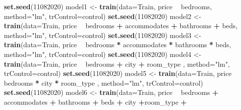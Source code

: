 \documentclass[]{book}
\newenvironment{Shaded}{\begin{snugshade}}{\end{snugshade}}
\newcommand{\KeywordTok}[1]{\textcolor[rgb]{0.13,0.29,0.53}{\textbf{#1}}}
\newcommand{\DataTypeTok}[1]{\textcolor[rgb]{0.13,0.29,0.53}{#1}}
\newcommand{\DecValTok}[1]{\textcolor[rgb]{0.00,0.00,0.81}{#1}}
\newcommand{\StringTok}[1]{\textcolor[rgb]{0.31,0.60,0.02}{#1}}
\newcommand{\OperatorTok}[1]{\textcolor[rgb]{0.81,0.36,0.00}{\textbf{#1}}}
\newcommand{\NormalTok}[1]{#1}
\begin{document}
\begin{Shaded}
\begin{Highlighting}[]
\KeywordTok{set.seed}\NormalTok{(}\DecValTok{11082020}\NormalTok{)}
\NormalTok{model1 <-}\StringTok{ }\KeywordTok{train}\NormalTok{(}\DataTypeTok{data=}\NormalTok{Train, price }\OperatorTok{~}\StringTok{ }\NormalTok{bedrooms,  }\DataTypeTok{method=}\StringTok{"lm"}\NormalTok{, }\DataTypeTok{trControl=}\NormalTok{control)}
\KeywordTok{set.seed}\NormalTok{(}\DecValTok{11082020}\NormalTok{)}
\NormalTok{model2 <-}\StringTok{ }\KeywordTok{train}\NormalTok{(}\DataTypeTok{data=}\NormalTok{Train, price }\OperatorTok{~}\StringTok{ }\NormalTok{bedrooms }\OperatorTok{+}\StringTok{ }\NormalTok{accommodates }\OperatorTok{+}\StringTok{ }\NormalTok{bathrooms }\OperatorTok{+}\StringTok{ }\NormalTok{beds,  }\DataTypeTok{method=}\StringTok{"lm"}\NormalTok{, }\DataTypeTok{trControl=}\NormalTok{control)}
\KeywordTok{set.seed}\NormalTok{(}\DecValTok{11082020}\NormalTok{)}
\NormalTok{model3 <-}\StringTok{ }\KeywordTok{train}\NormalTok{(}\DataTypeTok{data=}\NormalTok{Train, price }\OperatorTok{~}\StringTok{ }\NormalTok{bedrooms }\OperatorTok{*}\StringTok{ }\NormalTok{accommodates }\OperatorTok{*}\StringTok{ }\NormalTok{bathrooms }\OperatorTok{*}\StringTok{ }\NormalTok{beds,  }\DataTypeTok{method=}\StringTok{"lm"}\NormalTok{, }\DataTypeTok{trControl=}\NormalTok{control)}
\KeywordTok{set.seed}\NormalTok{(}\DecValTok{11082020}\NormalTok{)}
\NormalTok{model4 <-}\StringTok{ }\KeywordTok{train}\NormalTok{(}\DataTypeTok{data=}\NormalTok{Train, price }\OperatorTok{~}\StringTok{ }\NormalTok{bedrooms }\OperatorTok{+}\StringTok{ }\NormalTok{city }\OperatorTok{+}\StringTok{ }\NormalTok{room_type ,  }\DataTypeTok{method=}\StringTok{"lm"}\NormalTok{, }\DataTypeTok{trControl=}\NormalTok{control)}
\KeywordTok{set.seed}\NormalTok{(}\DecValTok{11082020}\NormalTok{)}
\NormalTok{model5 <-}\StringTok{ }\KeywordTok{train}\NormalTok{(}\DataTypeTok{data=}\NormalTok{Train, price }\OperatorTok{~}\StringTok{ }\NormalTok{bedrooms }\OperatorTok{*}\StringTok{ }\NormalTok{city }\OperatorTok{*}\StringTok{ }\NormalTok{room_type ,  }\DataTypeTok{method=}\StringTok{"lm"}\NormalTok{, }\DataTypeTok{trControl=}\NormalTok{control)}
\KeywordTok{set.seed}\NormalTok{(}\DecValTok{11082020}\NormalTok{)}
\NormalTok{model6 <-}\StringTok{ }\KeywordTok{train}\NormalTok{(}\DataTypeTok{data=}\NormalTok{Train, price }\OperatorTok{~}\StringTok{ }\NormalTok{bedrooms }\OperatorTok{+}\StringTok{ }\NormalTok{accommodates }\OperatorTok{+}\StringTok{ }\NormalTok{bathrooms }\OperatorTok{+}\StringTok{ }\NormalTok{beds }\OperatorTok{+}\StringTok{ }\NormalTok{city }\OperatorTok{+}\NormalTok{room_type }\OperatorTok{+}\StringTok{  }

\end{Highlighting}
\end{Shaded}
\end{document}
